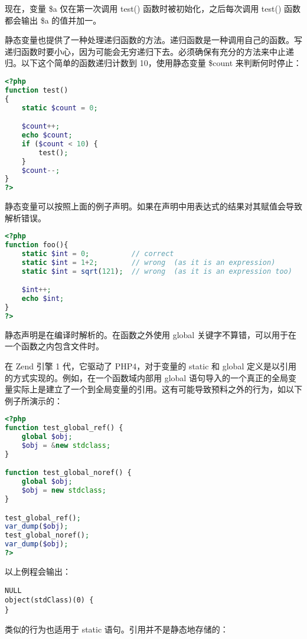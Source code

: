 现在，变量 \$a 仅在第一次调用 test() 函数时被初始化，之后每次调用 test() 函数都会输出 \$a 的值并加一。

静态变量也提供了一种处理递归函数的方法。递归函数是一种调用自己的函数。写递归函数时要小心，因为可能会无穷递归下去。必须确保有充分的方法来中止递归。以下这个简单的函数递归计数到 10，使用静态变量 \$count 来判断何时停止：

\begin{lstlisting}[language=PHP]
<?php
function test()
{
    static $count = 0;

    $count++;
    echo $count;
    if ($count < 10) {
        test();
    }
    $count--;
}
?>
\end{lstlisting}

静态变量可以按照上面的例子声明。如果在声明中用表达式的结果对其赋值会导致解析错误。


\begin{lstlisting}[language=PHP]
<?php
function foo(){
    static $int = 0;          // correct
    static $int = 1+2;        // wrong  (as it is an expression)
    static $int = sqrt(121);  // wrong  (as it is an expression too)

    $int++;
    echo $int;
}
?>
\end{lstlisting}

静态声明是在编译时解析的。在函数之外使用 global 关键字不算错，可以用于在一个函数之内包含文件时。

在 Zend 引擎 1 代，它驱动了 PHP4，对于变量的 static 和 global 定义是以引用的方式实现的。例如，在一个函数域内部用 global 语句导入的一个真正的全局变量实际上是建立了一个到全局变量的引用。这有可能导致预料之外的行为，如以下例子所演示的：

\begin{lstlisting}[language=PHP]
<?php
function test_global_ref() {
    global $obj;
    $obj = &new stdclass;
}

function test_global_noref() {
    global $obj;
    $obj = new stdclass;
}

test_global_ref();
var_dump($obj);
test_global_noref();
var_dump($obj);
?>
\end{lstlisting}

以上例程会输出：

\begin{verbatim}
NULL
object(stdClass)(0) {
}
\end{verbatim}

类似的行为也适用于 static 语句。引用并不是静态地存储的：

